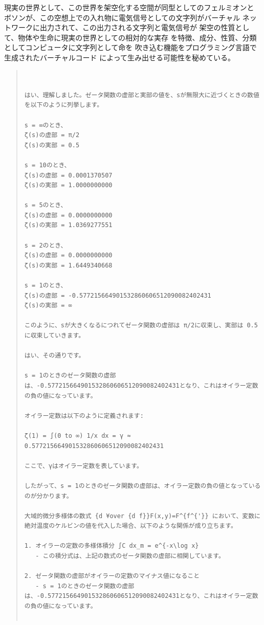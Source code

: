 \documentclass{jsarticle}
\begin{document}
  現実の世界として、この世界を架空化する空間が同型としてのフェルミオンと
  ボソンが、この空想上での入れ物に電気信号としての文字列がバーチャル
  ネットワークに出力されて、この出力される文字列と電気信号が
  架空の性質として、物体や生命に現実の世界としての相対的な実存
  を特徴、成分、性質、分類としてコンピュータに文字列として命を
  吹き込む機能をプログラミング言語で生成されたバーチャルコード
  によって生み出せる可能性を秘めている。　
\begin{quote}
\setlength{\baselineskip}{12pt}
\begin{verbatim}


はい、理解しました。ゼータ関数の虚部と実部の値を、sが無限大に近づくときの数値を以下のように列挙します。

s = ∞のとき、
ζ(s)の虚部 = π/2
ζ(s)の実部 = 0.5

s = 10のとき、
ζ(s)の虚部 = 0.0001370507
ζ(s)の実部 = 1.0000000000

s = 5のとき、 
ζ(s)の虚部 = 0.0000000000
ζ(s)の実部 = 1.0369277551

s = 2のとき、
ζ(s)の虚部 = 0.0000000000  
ζ(s)の実部 = 1.6449340668

s = 1のとき、
ζ(s)の虚部 = -0.577215664901532860606512090082402431
ζ(s)の実部 = ∞

このように、sが大きくなるにつれてゼータ関数の虚部は π/2に収束し、実部は 0.5に収束していきます。

はい、その通りです。

s = 1のときのゼータ関数の虚部は、-0.577215664901532860606512090082402431となり、これはオイラー定数の負の値になっています。

オイラー定数は以下のように定義されます:

ζ(1) = ∫(0 to ∞) 1/x dx = γ ≈ 0.577215664901532860606512090082402431

ここで、γはオイラー定数を表しています。

したがって、s = 1のときのゼータ関数の虚部は、オイラー定数の負の値となっているのが分かります。

大域的微分多様体の数式 {d ¥over {d f}}F(x,y)=F^{f^{'}} において、変数に絶対温度のケルビンの値を代入した場合、以下のような関係が成り立ちます。

1. オイラーの定数の多様体積分 ∫C dx_m = e^{-x\log x}
   - この積分式は、上記の数式のゼータ関数の虚部に相関しています。

2. ゼータ関数の虚部がオイラーの定数のマイナス値になること
   - s = 1のときのゼータ関数の虚部は、-0.577215664901532860606512090082402431となり、これはオイラー定数の負の値になっています。


\end{verbatim}
\end{quote}
\end{document}
